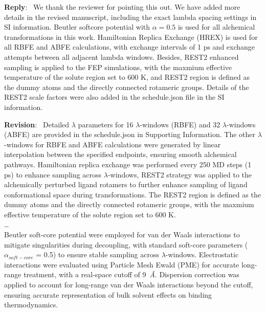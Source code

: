 \documentclass[doublespace,prb,aps]{article}
\newcounter{reviewer}
\newcounter{point}[reviewer]
\newenvironment{reply}
   {\medskip \noindent \color{black} \begin{sf}\textbf{Reply}:\  }
   {\medskip \par \end{sf}}
\newenvironment{revision}
   {\medskip \noindent \color{blue} \begin{sf}\textbf{Revision}:\textit{\ }}
   {\medskip \par \end{sf}}
\begin{document}
\begin{reply}
We thank the reviewer for pointing this out. 
We have added more details in the revised manuscript, 
including the exact lambda spacing settings in SI information.
Beutler softcore potential with $\alpha=0.5$ is used for all alchemical transformations in this work. 
Hamiltonian Replica Exchange (HREX) is used for all RBFE and ABFE calculations, with exchange intervals of 1 ps and exchange attempts between all adjacent lambda windows.
Besides, REST2 enhanced sampling is applied to the FEP simulations, 
with the maxmium effective temperature of the solute region set to 600 K, 
and REST2 region is defined as the dummy atoms and the directly connected rotameric groups.
Details of the REST2 scale factors were also added in the schedule.json file in the SI information.
\end{reply}

\begin{revision}
Detailed $\lambda$ parameters for 16 $\lambda$-windows (RBFE) and 32 $\lambda$-windows (ABFE) are provided in the schedule.json in Supporting Information.
The other $\lambda$-windows for RBFE and ABFE calculations were generated by linear interpolation between the specified endpoints, ensuring smooth alchemical pathways.
Hamiltonian replica exchange was performed every 250 MD steps (1 ps) to enhance sampling across $\lambda$-windows,
REST2 strategy was applied to the alchemically perturbed ligand rotamers to further enhance sampling of ligand conformational space during transformations.
The REST2 region is defined as the dummy atoms and the directly connected rotameric groups, 
with the maxmium effective temperature of the solute region set to 600 K. \\
\dots \\
\newline
Beutler soft-core potential were employed for van der Waals interactions to 
mitigate singularities during decoupling, with standard soft-core parameters ($\alpha_{soft-core}$ = 0.5) to ensure stable sampling across $\lambda$-windows.
Electrostatic interactions were evaluated using Particle Mesh Ewald (PME) for accurate long-range treatment, with a real-space cutoff of 9~\textit{\AA}.
Dispersion correction was applied to account for long-range van der Waals interactions beyond the cutoff, ensuring accurate representation of bulk solvent effects on binding thermodynamics.
\end{revision}
\end{document}
